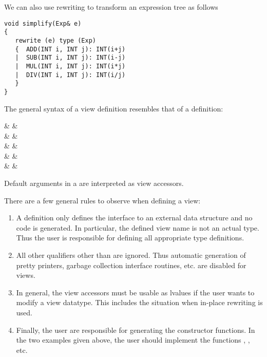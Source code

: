 We can also use rewriting to transform an expression tree as follows

\begin{verbatim}
void simplify(Exp& e)
{
   rewrite (e) type (Exp)
   {  ADD(INT i, INT j): INT(i+j)
   |  SUB(INT i, INT j): INT(i-j)
   |  MUL(INT i, INT j): INT(i*j)
   |  DIV(INT i, INT j): INT(i/j)
   }
}
\end{verbatim}


The general syntax of a view definition resembles that of a
 definition:

\begin{syntax}
   & \IS &  \\
   & \IS & \Id \T{::}  \T{=} \\ 
   &     & \quad {} \T{(}  \T{)} \\
   &     & \quad {} \\
   & \IS &  \\
\end{syntax}

Default arguments in a  are interpreted as view accessors.

There are a few general rules to observe when defining a view:
\begin{enumerate}
 \item A  definition only defines the interface
 to an external data structure and no code is generated.  In particular,
 the defined view name is not an actual \Cpp{} type.
 Thus the user is responsible for defining all appropriate type definitions.
 \item All other qualifiers other than  are ignored.   Thus 
 automatic generation of pretty printers, garbage collection interface
 routines, etc. are disabled for views.
 \item In general, the view accessors must be usable as lvalues
 if the user wants to modify a view datatype.  This includes the
 situation when in-place rewriting is used.
 \item Finally, the user are responsible for generating the
 constructor functions.  In the two examples given above, the user
 should implement the functions , , etc.  
\end{enumerate}

